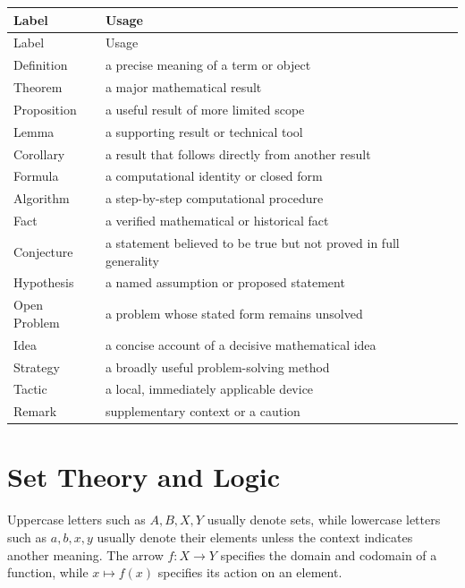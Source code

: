     {\small
    \renewcommand{\arraystretch}{1.18}
    \begin{longtable}{@{}L{0.24\textwidth}L{0.68\textwidth}@{}}
        \toprule
        Label & Usage \\
        \midrule
        \endfirsthead

        \toprule
        Label & Usage \\
        \midrule
        \endhead

        \bottomrule
        \endlastfoot

        Definition & a precise meaning of a term or object \\
        Theorem & a major mathematical result \\
        Proposition & a useful result of more limited scope \\
        Lemma & a supporting result or technical tool \\
        Corollary & a result that follows directly from another result \\
        Formula & a computational identity or closed form \\
        Algorithm & a step-by-step computational procedure \\
        Fact & a verified mathematical or historical fact \\
        Conjecture & a statement believed to be true but not proved in full generality \\
        Hypothesis & a named assumption or proposed statement \\
        Open Problem & a problem whose stated form remains unsolved \\
        Idea & a concise account of a decisive mathematical idea \\
        Strategy & a broadly useful problem-solving method \\
        Tactic & a local, immediately applicable device \\
        Remark & supplementary context or a caution \\
    \end{longtable}
    }

    \section*{Set Theory and Logic}

    Uppercase letters such as $A,B,X,Y$ usually denote sets, while lowercase
    letters such as $a,b,x,y$ usually denote their elements unless the context
    indicates another meaning. The arrow $f:X\to Y$ specifies the domain and
    codomain of a function, while $x\mapsto f(x)$ specifies its action on an
    element.

